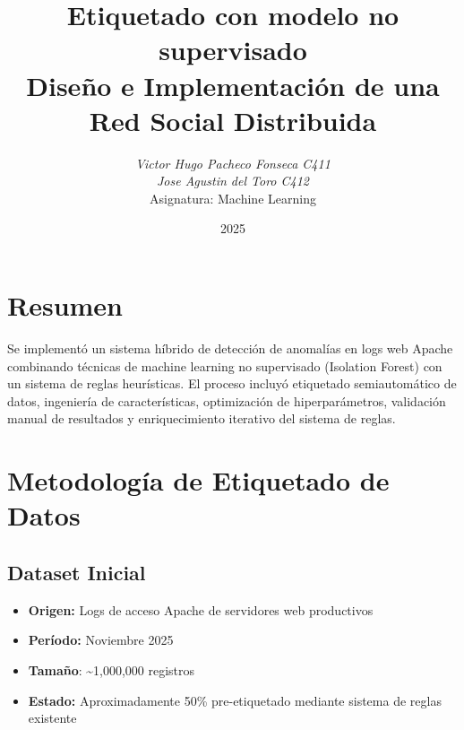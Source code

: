 \documentclass[12pt]{article}
\title{%
	\vspace{1cm}
	\Huge \textbf{Etiquetado con modelo no supervisado}\\[6pt]
	\Large \textbf{Diseño e Implementación de una Red Social Distribuida}\\[12pt]
}
\author{\textit{Victor Hugo Pacheco Fonseca C411}\\
	\textit{Jose Agustin del Toro C412}\\
	Asignatura: Machine Learning}
\date{2025}
\begin{document}
	
	\maketitle
	\tableofcontents
	\newpage
	
	\section{Resumen}
	Se implementó un sistema híbrido de detección de anomalías en logs web Apache combinando técnicas de machine learning no supervisado (Isolation Forest) con un sistema de reglas heurísticas. El proceso incluyó etiquetado semiautomático de datos, ingeniería de características, optimización de hiperparámetros, validación manual de resultados y enriquecimiento iterativo del sistema de reglas.
	
	\section{Metodología de Etiquetado de Datos}
	\subsection{Dataset Inicial}
	\begin{itemize}
		\item \textbf{Origen:} Logs de acceso Apache de servidores web productivos
		\item \textbf{Período:} Noviembre 2025
		\item \textbf{Tamaño}: \textasciitilde 1,000,000 registros
		\item \textbf{Estado:} Aproximadamente 50\% pre-etiquetado mediante sistema de reglas existente
	\end{itemize}
\end{document}
